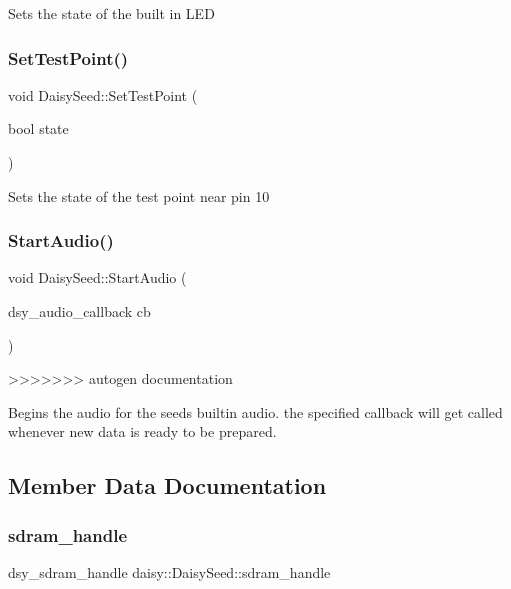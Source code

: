 \begin{DoxyCompactItemize}
Sets the state of the built in L\+ED \mbox{\label{classdaisy_1_1_daisy_seed_a42076d8611eded177b22f5602630dda7}} 
\subsubsection{\texorpdfstring{Set\+Test\+Point()}{SetTestPoint()}}
{\footnotesize\ttfamily void Daisy\+Seed\+::\+Set\+Test\+Point (\begin{DoxyParamCaption}\item[{bool}]{state }\end{DoxyParamCaption})}

Sets the state of the test point near pin 10 \mbox{\label{classdaisy_1_1_daisy_seed_a86689003d9495e1bc71e47bffecea145}} 
\subsubsection{\texorpdfstring{Start\+Audio()}{StartAudio()}}
{\footnotesize\ttfamily void Daisy\+Seed\+::\+Start\+Audio (\begin{DoxyParamCaption}\item[{dsy\+\_\+audio\+\_\+callback}]{cb }\end{DoxyParamCaption})}
>>>>>>> autogen documentation

Begins the audio for the seeds builtin audio. the specified callback will get called whenever new data is ready to be prepared. 

\subsection{Member Data Documentation}
\mbox{\label{classdaisy_1_1_daisy_seed_a03d712e565ea71ec3d7126d0bbab6220}} 
\subsubsection{\texorpdfstring{sdram\+\_\+handle}{sdram\_handle}}
{\footnotesize\ttfamily dsy\+\_\+sdram\+\_\+handle daisy\+::\+Daisy\+Seed\+::sdram\+\_\+handle}


\end{DoxyCompactItemize}
